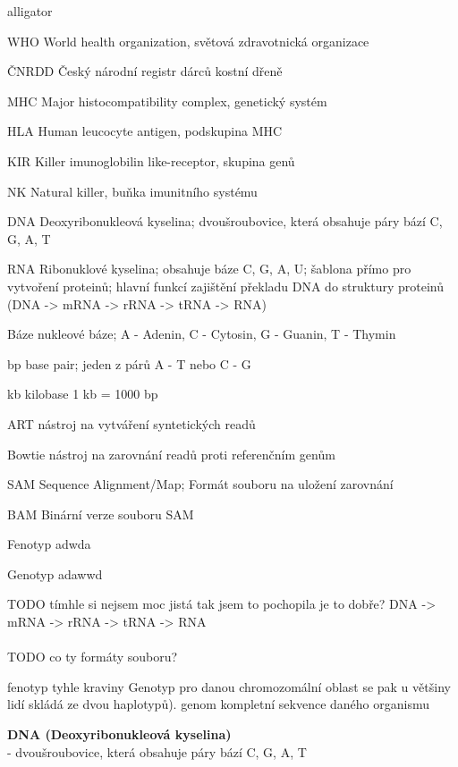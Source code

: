 \documentclass[czech,DP]{thesiskiv}
\numberwithin{equation}{section}
\begin{document}
\begin{labeling}{alligator}
	\item [WHO] World health organization, světová zdravotnická organizace
	\item [ČNRDD] Český národní registr dárců kostní dřeně
	\item [MHC] Major histocompatibility complex, genetický systém	
	\item [HLA] Human leucocyte antigen, podskupina MHC
	\item [KIR] Killer imunoglobilin like-receptor, skupina genů
	\item [NK] Natural killer, buňka imunitního systému
	\item [DNA] Deoxyribonukleová kyselina; dvoušroubovice, která obsahuje páry bází C, G, A, T 
	\item [RNA] Ribonuklové kyselina; obsahuje báze C, G, A, U; šablona přímo pro vytvoření proteinů; hlavní funkcí zajištění překladu DNA do struktury proteinů (DNA -> mRNA -> rRNA -> tRNA -> RNA) 
	\item [Báze] nukleové báze; A - Adenin, C - Cytosin, G - Guanin, T - Thymin
	\item [bp] base pair; jeden z párů A - T nebo C - G
	\item [kb] kilobase 1 kb = 1000 bp
	\item [ART] nástroj na vytváření syntetických readů
	\item [Bowtie] nástroj na zarovnání readů proti referenčním genům
	\item [SAM] Sequence Alignment/Map; Formát souboru na uložení zarovnání
	\item [BAM] Binární verze souboru SAM
	\item [Fenotyp] adwda
	\item [Genotyp] adawwd
\end{labeling}


TODO tímhle si nejsem moc jistá tak jsem to pochopila je to dobře? DNA -> mRNA -> rRNA -> tRNA -> RNA
\\
\\
TODO co ty formáty souboru?

fenotyp tyhle kraviny
Genotyp pro danou chromozomální oblast se pak u většiny lidí skládá ze dvou haplotypů).
genom kompletní sekvence daného organismu

\textbf{DNA (Deoxyribonukleová kyselina)} \\ 
 - dvoušroubovice, která obsahuje páry bází C, G, A, T \\
\end{document}
